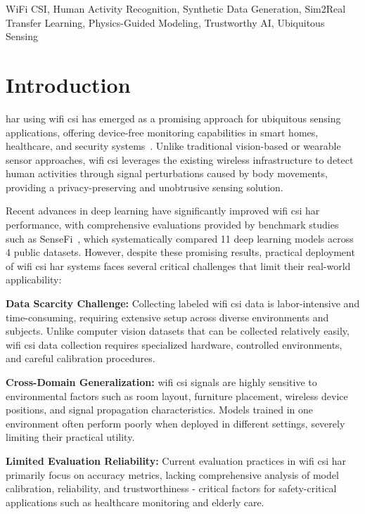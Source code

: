 \documentclass[journal]{IEEEtran}
\begin{document}
\begin{IEEEkeywords}
WiFi CSI, Human Activity Recognition, Synthetic Data Generation, Sim2Real Transfer Learning, Physics-Guided Modeling, Trustworthy AI, Ubiquitous Sensing
\end{IEEEkeywords}

\section{Introduction}


\gls{har} using \gls{wifi} \gls{csi} has emerged as a promising approach for ubiquitous sensing applications, offering device-free monitoring capabilities in smart homes, healthcare, and security systems~\cite{csi_survey2019}. Unlike traditional vision-based or wearable sensor approaches, \gls{wifi} \gls{csi} leverages the existing wireless infrastructure to detect human activities through signal perturbations caused by body movements, providing a privacy-preserving and unobtrusive sensing solution.

Recent advances in deep learning have significantly improved \gls{wifi} \gls{csi} \gls{har} performance, with comprehensive evaluations provided by benchmark studies such as SenseFi~\cite{yang2023sensefi}, which systematically compared 11 deep learning models across 4 public datasets. However, despite these promising results, practical deployment of \gls{wifi} \gls{csi} \gls{har} systems faces several critical challenges that limit their real-world applicability:

\textbf{Data Scarcity Challenge:} Collecting labeled \gls{wifi} \gls{csi} data is labor-intensive and time-consuming, requiring extensive setup across diverse environments and subjects. Unlike computer vision datasets that can be collected relatively easily, \gls{wifi} \gls{csi} data collection requires specialized hardware, controlled environments, and careful calibration procedures.

\textbf{Cross-Domain Generalization:} \gls{wifi} \gls{csi} signals are highly sensitive to environmental factors such as room layout, furniture placement, wireless device positions, and signal propagation characteristics. Models trained in one environment often perform poorly when deployed in different settings, severely limiting their practical utility.

\textbf{Limited Evaluation Reliability:} Current evaluation practices in \gls{wifi} \gls{csi} \gls{har} primarily focus on accuracy metrics, lacking comprehensive analysis of model calibration, reliability, and trustworthiness - critical factors for safety-critical applications such as healthcare monitoring and elderly care.
\end{document}
